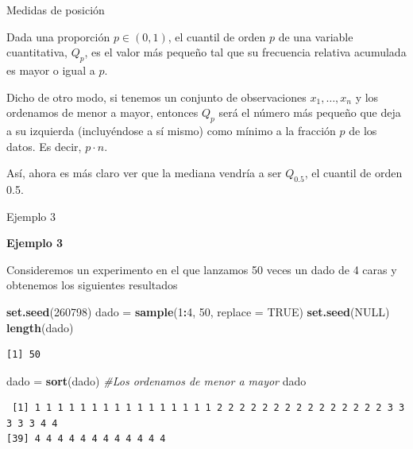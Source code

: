 \documentclass[
  ignorenonframetext,
]{beamer}
\newenvironment{Shaded}{\begin{snugshade}}{\end{snugshade}}
\newcommand{\CommentTok}[1]{\textcolor[rgb]{0.56,0.35,0.01}{\textit{#1}}}
\newcommand{\DataTypeTok}[1]{\textcolor[rgb]{0.13,0.29,0.53}{#1}}
\newcommand{\DecValTok}[1]{\textcolor[rgb]{0.00,0.00,0.81}{#1}}
\newcommand{\KeywordTok}[1]{\textcolor[rgb]{0.13,0.29,0.53}{\textbf{#1}}}
\newcommand{\NormalTok}[1]{#1}
\newcommand{\OperatorTok}[1]{\textcolor[rgb]{0.81,0.36,0.00}{\textbf{#1}}}
\newcommand{\OtherTok}[1]{\textcolor[rgb]{0.56,0.35,0.01}{#1}}
\newcommand{\StringTok}[1]{\textcolor[rgb]{0.31,0.60,0.02}{#1}}
\begin{document}
\begin{frame}{Medidas de posición}
\protect\hypertarget{medidas-de-posiciuxf3n-2}{}

Dada una proporción \(p\in(0,1)\), el cuantil de orden \(p\) de una
variable cuantitativa, \(Q_p\), es el valor más pequeño tal que su
frecuencia relativa acumulada es mayor o igual a \(p\).

Dicho de otro modo, si tenemos un conjunto de observaciones
\(x_1,\dots,x_n\) y los ordenamos de menor a mayor, entonces \(Q_p\)
será el número más pequeño que deja a su izquierda (incluyéndose a sí
mismo) como mínimo a la fracción \(p\) de los datos. Es decir,
\(p\cdot n\).

Así, ahora es más claro ver que la mediana vendría a ser \(Q_{0.5}\), el
cuantil de orden 0.5.

\end{frame}

\begin{frame}[fragile]{Ejemplo 3}
\protect\hypertarget{ejemplo-3}{}

\textbf{Ejemplo 3}

Consideremos un experimento en el que lanzamos 50 veces un dado de 4
caras y obtenemos los siguientes resultados

\begin{Shaded}
\begin{Highlighting}[]
\KeywordTok{set.seed}\NormalTok{(}\DecValTok{260798}\NormalTok{)}
\NormalTok{dado =}\StringTok{ }\KeywordTok{sample}\NormalTok{(}\DecValTok{1}\OperatorTok{:}\DecValTok{4}\NormalTok{, }\DecValTok{50}\NormalTok{, }\DataTypeTok{replace =} \OtherTok{TRUE}\NormalTok{)}
\KeywordTok{set.seed}\NormalTok{(}\OtherTok{NULL}\NormalTok{)}
\KeywordTok{length}\NormalTok{(dado)}
\end{Highlighting}
\end{Shaded}

\begin{verbatim}
[1] 50
\end{verbatim}

\begin{Shaded}
\begin{Highlighting}[]
\NormalTok{dado =}\StringTok{ }\KeywordTok{sort}\NormalTok{(dado) }\CommentTok{#Los ordenamos de menor a mayor}
\NormalTok{dado}
\end{Highlighting}
\end{Shaded}

\begin{verbatim}
 [1] 1 1 1 1 1 1 1 1 1 1 1 1 1 1 1 1 2 2 2 2 2 2 2 2 2 2 2 2 2 2 2 3 3 3 3 3 4 4
[39] 4 4 4 4 4 4 4 4 4 4 4 4
\end{verbatim}

\end{frame}
\end{document}
